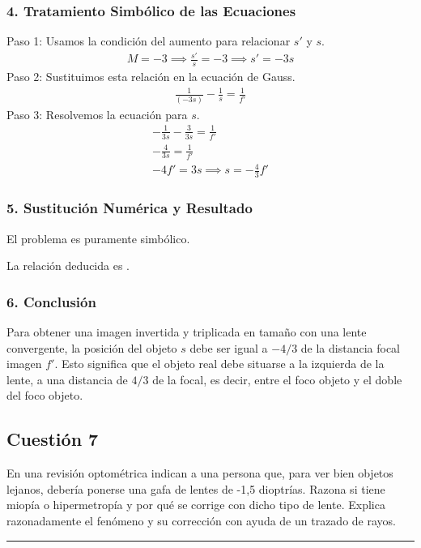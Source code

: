 \subsubsection*{4. Tratamiento Simbólico de las Ecuaciones}
Paso 1: Usamos la condición del aumento para relacionar $s'$ y $s$.
\begin{gather}
    M = -3 \implies \frac{s'}{s} = -3 \implies s' = -3s
\end{gather}
Paso 2: Sustituimos esta relación en la ecuación de Gauss.
\begin{gather}
    \frac{1}{(-3s)} - \frac{1}{s} = \frac{1}{f'}
\end{gather}
Paso 3: Resolvemos la ecuación para $s$.
\begin{gather}
    -\frac{1}{3s} - \frac{3}{3s} = \frac{1}{f'} \nonumber \\
    -\frac{4}{3s} = \frac{1}{f'} \nonumber \\
    -4f' = 3s \implies s = -\frac{4}{3}f'
\end{gather}

\subsubsection*{5. Sustitución Numérica y Resultado}
El problema es puramente simbólico.
\begin{cajaresultado}
    La relación deducida es .
\end{cajaresultado}

\subsubsection*{6. Conclusión}
\begin{cajaconclusion}
Para obtener una imagen invertida y triplicada en tamaño con una lente convergente, la posición del objeto $s$ debe ser igual a $-4/3$ de la distancia focal imagen $f'$. Esto significa que el objeto real debe situarse a la izquierda de la lente, a una distancia de $4/3$ de la focal, es decir, entre el foco objeto y el doble del foco objeto.
\end{cajaconclusion}

\newpage
\subsection{Cuestión 7}
\label{subsec:C7_2020_jul_ext_b}

\begin{cajaenunciado}
En una revisión optométrica indican a una persona que, para ver bien objetos lejanos, debería ponerse una gafa de lentes de -1,5 dioptrías. Razona si tiene miopía o hipermetropía y por qué se corrige con dicho tipo de lente. Explica razonadamente el fenómeno y su corrección con ayuda de un trazado de rayos.
\end{cajaenunciado}
\hrule

